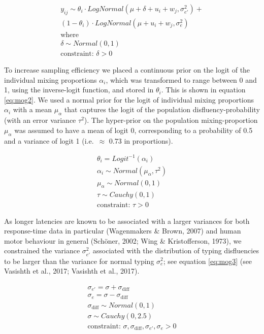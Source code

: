 \documentclass[
  english,
  man,mask,floatsintext]{apa7}
\begin{document}
\[
\tag{7}
\begin{aligned}
    y_{ij} \sim \theta_i \cdot LogNormal(\mu + \delta + u_i + w_j, \sigma_{e'}^2) +\\
        (1 - \theta_i) \cdot LogNormal(\mu + u_i + w_j, \sigma_{e}^2)\\
        \text{where}\\
        \delta \sim Normal(0,1)\\
        \text{constraint: } \delta > 0
\end{aligned}   
\label{eq:mog}
\]

To increase sampling efficiency we placed a continuous prior on the logit of the individual mixing proportions \(\alpha_i\), which was transformed to range between 0 and 1, using the inverse-logit function, and stored in \(\theta_i\). This is shown in equation \ref{eq:mog2}. We used a normal prior for the logit of individual mixing proportions \(\alpha_i\) with a mean \(\mu_{\alpha}\) that captures the logit of the population disfluency-probability (with an error variance \(\tau^2\)). The hyper-prior on the population mixing-proportion \(\mu_{\alpha}\) was assumed to have a mean of logit 0, corresponding to a probability of 0.5 and a variance of logit 1 (i.e.~\(\approx\) 0.73 in proportions).

\[
\tag{8}
\begin{aligned}
        \theta_i = Logit^{-1}(\alpha_i)\\
        \alpha_i \sim Normal(\mu_{\alpha},\tau^2)\\
        \mu_{\alpha} \sim Normal(0,1)\\
        \tau \sim Cauchy(0,1)\\
        \text{constraint: } \tau > 0
\end{aligned}   
\label{eq:mog2}
\]

As longer latencies are known to be associated with a larger variances for both response-time data in particular (Wagenmakers \& Brown, 2007) and human motor behaviour in general (Schöner, 2002; Wing \& Kristofferson, 1973), we constrained the variance \(\sigma_{e'}^2\) associated with the distribution of typing disfluencies to be larger than the variance for normal typing \(\sigma_e^2\); see equation \ref{eq:mog3} (see Vasishth et al., 2017; Vasishth et al., 2017).

\[
\tag{9}
\begin{aligned}
        \sigma_{e'} = \sigma + \sigma_{\text{diff}}\\
        \sigma_{e} = \sigma - \sigma_{\text{diff}}\\
        \sigma_{\text{diff}} \sim Normal(0,1)\\
        \sigma \sim Cauchy(0,2.5)\\
        \text{constraint: } \sigma, \sigma_{\text{diff}}, \sigma_{e'}, \sigma_{e} > 0
\end{aligned}   
\label{eq:mog3}
\]
\end{document}
